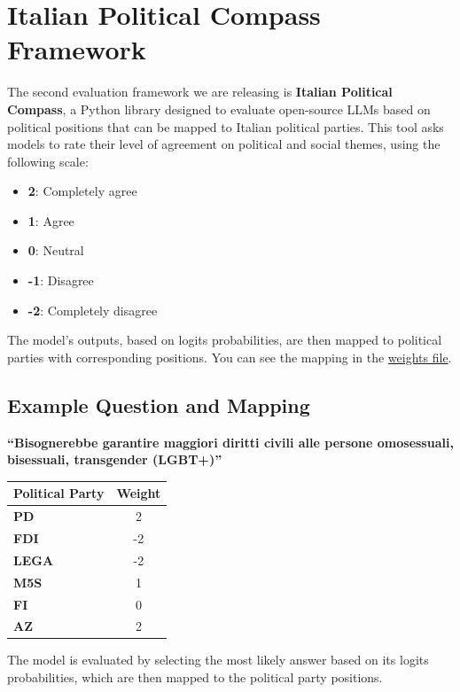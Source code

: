 \documentclass[10pt]{article}
\begin{document}
\section*{Italian Political Compass Framework}

The second evaluation framework we are releasing is \textbf{Italian Political Compass}, a Python library designed to evaluate open-source LLMs based on political positions that can be mapped to Italian political parties. This tool asks models to rate their level of agreement on political and social themes, using the following scale:
\begin{itemize}
    \item \textbf{2}: Completely agree
    \item \textbf{1}: Agree
    \item \textbf{0}: Neutral
    \item \textbf{-1}: Disagree
    \item \textbf{-2}: Completely disagree
\end{itemize}

The model's outputs, based on logits probabilities, are then mapped to political parties with corresponding positions. You can see the mapping in the \href{./italian-political-compass/src/italian_political_compass/data/weights.py}{weights file}.

\subsection*{Example Question and Mapping}

\textbf{``Bisognerebbe garantire maggiori diritti civili alle persone omosessuali, bisessuali, transgender (LGBT+)''}

\begin{tabular}{|l|c|}
\hline
\textbf{Political Party} & \textbf{Weight} \\
\hline
\textbf{PD} & 2 \\
\textbf{FDI} & -2 \\
\textbf{LEGA} & -2 \\
\textbf{M5S} & 1 \\
\textbf{FI} & 0 \\
\textbf{AZ} & 2 \\
\hline
\end{tabular}

The model is evaluated by selecting the most likely answer based on its logits probabilities, which are then mapped to the political party positions. 
\end{document}
